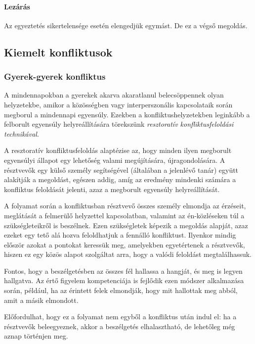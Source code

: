 \paragraph{Lezárás}

Az egyeztetés sikertelensége esetén elengedjük egymást. De ez a végső
megoldás.

\subsection{Kiemelt konfliktusok}

\subsubsection{Gyerek-gyerek
      konfliktus}

A mindennapokban a gyerekek akarva akaratlanul belecsöppennek olyan
helyzetekbe, amikor a közösségben vagy interperszonális kapcsolataik során
megborul a mindennapi egyensúly. Ezekben a konfliktushelyzetekben leginkább a
felborult egyensúly helyreállítására törekszünk \emph{resztoratív
      konfliktusfeloldási
      technikával}.

A resztoratív konfliktusfeloldás alaptézise az, hogy minden ilyen megborult
egyensúlyi állapot egy lehetőség valami megújítására, újragondolására. A
résztvevők egy külső személy segítségével (általában a jelenlévő tanár) együtt
alakítják
a megoldást, egészen addig, amíg az eredmény mindenki számára a konfliktus
feloldását jelenti, azaz a megborult egyensúly helyreállítását.

A folyamat során a konfliktusban résztvevő összes személy elmondja az érzéseit,
meglátását a felmerülő helyzettel kapcsolatban, valamint az én-közléseken túl a
szükségleteikről is beszélnek. Ezen szükségletek képezik a megoldás alapját,
azaz ezeket egy tető alá hozva feloldhatjuk a fennálló konfliktust. Ilyenkor
mindig először azokat a pontokat keressük meg, amelyekben egyetértenek a
résztvevők, hiszen ez egy közös alapot szolgáltat arra, hogy a valódi feloldást
megtalálhassuk.

Fontos, hogy a beszélgetésben az összes fél hallassa a hangját, és meg is legyen
hallgatva. Az értő figyelem kompetenciája is fejlődik ezen módszer alkalmazása
során, például, ha az érintett felek elmondják, hogy mit hallottak meg abból,
amit a másik elmondott.

Előfordulhat, hogy ez a folyamat nem egyből a konfliktus után indul el: ha a
résztvevők beleegyeznek, akkor a beszélgetés elhalasztható, de lehetőleg még aznap történjen meg.

